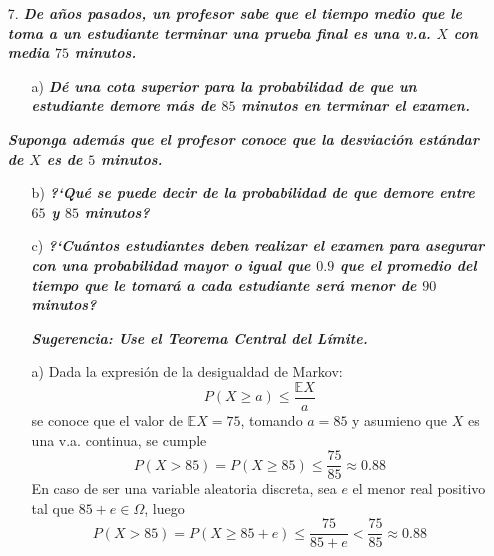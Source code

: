 \documentclass[a4paper,11pt]{article}
\begin{document}
\begin{itemize}
\item[7.] \textit{\bfseries De a\~nos pasados, un profesor sabe que el tiempo medio que le toma a un estudiante terminar una prueba final es una v.a. $X$
con media $75$ minutos.}
\begin{itemize}
\item[a)] \textit{\bfseries D\'e una cota superior para la probabilidad de que un estudiante demore m\'as de $85$ minutos en terminar el examen.}
\end{itemize}
\textit{\bfseries Suponga adem\'as que el profesor conoce que la desviaci\'on est\'andar de $X$ es de $5$ minutos.}
\begin{itemize}
\item[b)] \textit{\bfseries ?`Qu\'e se puede decir de la probabilidad de que demore entre $65$ y $85$ minutos?}
\item[c)] \textit{\bfseries ?`Cu\'antos estudiantes deben realizar el examen para asegurar con una probabilidad mayor o igual que $0.9$ que el promedio del tiempo que le tomar\'a a cada estudiante ser\'a menor de $90$ minutos?}
\par \textit{\bfseries Sugerencia: Use el Teorema Central del L\'imite.}\\
\end{itemize}

\begin{itemize}
\item[a)] Dada la expresi\'on de la desigualdad de Markov:
$$
P(X\geq a)\leq \frac{\mathbb{E}X}{a}
$$
se conoce que el valor de $\mathbb{E}X=75$, tomando $a=85$ y asumieno que $X$ es una v.a. continua, se cumple
$$
P(X> 85)=P(X\geq 85)\leq \frac{75}{85}\approx 0.88
$$
En caso de ser una variable aleatoria discreta, sea $e$ el menor real positivo tal que $85+e\in\Omega$, luego
$$
P(X> 85)= P(X\geq 85+e)\leq \frac{75}{85+e}< \frac{75}{85}\approx 0.88
$$


\end{itemize}
\end{itemize}
\end{document}
